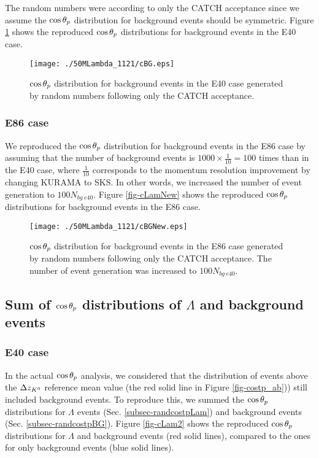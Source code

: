 The random numbers were according to only the CATCH acceptance since we assume the $\cos{\theta_p}$ distribution for background events should be symmetric. Figure \ref{fig-cBG} shows the reproduced $\cos{\theta_p}$ distributions for background events in the E40 case. 

\begin{figure}[h]
  \centering
  \texttt{[image: ./50MLambda\_1121/cBG.eps]}
  \caption{$\cos{\theta_p}$ distribution for background events in the E40 case generated by random numbers following only the CATCH acceptance. %
  }
  \label{fig-cBG}
\end{figure}

\subsubsection{E86 case}
We reproduced the $\cos{\theta_p}$ distribution for background events in the E86 case by assuming that the number of background events is $1000\times\frac{1}{10}=100$ times than in the E40 case, where $\frac{1}{10}$ corresponds to the momentum resolution improvement by changing KURAMA to SKS. In other words, we increased the number of event generation to $100 N_{bg\ e40}$. Figure \ref{fig-cLamNew} shows the reproduced $\cos{\theta_p}$ distributions for background events in the E86 case.

\begin{figure}[h]
  \centering
  \texttt{[image: ./50MLambda\_1121/cBGNew.eps]}
  \caption{$\cos{\theta_p}$ distribution for background events in the E86 case generated by random numbers following only the CATCH acceptance. The number of event generation was increased to $100 N_{bg\ e40}$.}
  \label{fig-cBGNew}
\end{figure}


\subsection{Sum of $\cos{\theta_p}$ distributions of $\Lambda$ and background events}
\subsubsection{E40 case}
\label{subsubsec-sume40}
In the actual $\cos{\theta_p}$ analysis, we considered that the distribution of events above the $\Delta z_{K^{0}}$ reference mean value (the red solid line in Figure \ref{fig-costp_ab})) still included background events. To reproduce this, we summed the $\cos{\theta_p}$ distributions for $\Lambda$ events (Sec. \ref{subsec-randcostpLam}) and background events (Sec. \ref{subsec-randcostpBG}). Figure \ref{fig-cLam2} shows the reproduced $\cos{\theta_p}$ distributions for $\Lambda$ and background events (red solid lines), compared to the ones for only background events (blue solid lines). 

